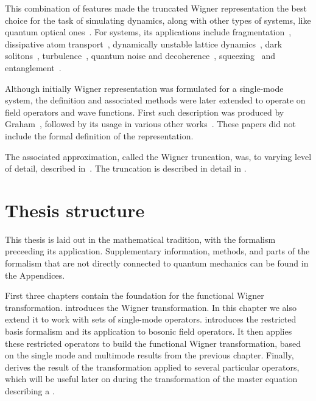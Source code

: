 This combination of features made the truncated Wigner representation the best choice for the task of simulating  dynamics, along with other types of systems, like quantum optical ones~\cite{Drummond1993,Drummond1993a,Corney2008,Corney2006}.
For  systems, its applications include fragmentation~\cite{Isella2006,Isella2005,Gross2011}, dissipative atom transport~\cite{Ruostekoski2005}, dynamically unstable lattice dynamics~\cite{Shrestha2009}, dark solitons~\cite{Martin2010,Martin2010a}, turbulence~\cite{Norrie2005,Norrie2006}, quantum noise and decoherence~\cite{Steel1998,Norrie2006a,Egorov2011}, squeezing~\cite{Opanchuk2012} and entanglement~\cite{Opanchuk2012a}.

Although initially Wigner representation was formulated for a single-mode system, the definition and associated methods were later extended to operate on field operators and wave functions.
First such description was produced by Graham~\cite{Graham1970,Graham1970a}, followed by its usage in various other works~\cite{Steel1998,Gardiner2003,Isella2006,Norrie2006,Norrie2006a,Blakie2008,Martin2010,Polkovnikov2010,Gross2011}.
These papers did not include the formal definition of the representation.

The associated approximation, called the Wigner truncation, was, to varying level of detail, described in~\cite{Drummond1993,Steel1998,Sinatra2002}.
The truncation is described in detail in .


\section{Thesis structure}

This thesis is laid out in the mathematical tradition, with the formalism preceeding its application.
Supplementary information, methods, and parts of the formalism that are not directly connected to quantum mechanics can be found in the Appendices.

First three chapters contain the foundation for the functional Wigner transformation.
 introduces the Wigner transformation.
In this chapter we also extend it to work with sets of single-mode operators.
 introduces the restricted basis formalism and its application to bosonic field operators.
It then applies these restricted operators to build the functional Wigner transformation, based on the single mode and multimode results from the previous chapter.
Finally,  derives the result of the transformation applied to several particular operators, which will be useful later on during the transformation of the master equation describing a .

